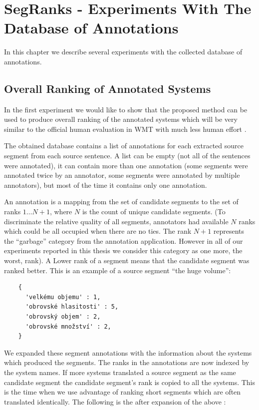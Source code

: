 \chapter{SegRanks - Experiments With The Database of Annotations}

In this chapter we describe several experiments with the collected database of
annotations. 

\section{Overall Ranking of Annotated Systems}
\label{evaluating-annotated-systems}

In the first experiment we would like to show that the proposed method can be
used to produce overall ranking of the annotated systems which will be very
similar to the official human evaluation in WMT with much less human effort
.

The obtained database contains a list of annotations for each extracted source
segment from each source sentence. A list can be empty (not all of the
sentences were annotated), it can contain more than one annotation (some
segments were annotated twice by an annotator, some segments were annotated by
multiple annotators), but most of the time it contains only one annotation.

An annotation is a mapping from the set of candidate segments to the set of
ranks ${1 \ldots N+1}$, where $N$ is the count of unique candidate segments.
(To discriminate the relative quality of all segments, annotators had available
$N$ ranks which could be all occupied when there are no ties. The rank $N+1$
represents the ``garbage'' category from the annotation application. However in
all of our experiments reported in this thesis we consider this category as one
more, the worst, rank). A Lower rank of a segment means that the candidate
segment was ranked better. This is an example  of a
source segment ``the huge volume'':

\begin{verbatim}
    {
      'velkému objemu' : 1,
      'obrovské hlasitosti' : 5,
      'obrovský objem' : 2,
      'obrovské množství' : 2,
    }
\end{verbatim}

We expanded these segment annotations with the information about the systems
which produced the segments. The ranks in the annotations are now indexed by
the system names.  If more systems translated a source segment as the same
candidate segment the candidate segment's rank is copied to all the systems.
This is the time when we use advantage of ranking short segments which are
often translated identically.  The following is the 
after expansion of the above :

